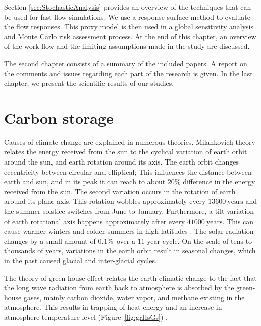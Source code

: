 Section \ref{sec:StochasticAnalysis} provides an overview of the techniques that can be used for fast flow simulations. We use a response surface
method to evaluate the flow responses. This proxy model is then used in a global sensitivity analysis and Monte Carlo risk assessment process. At the end of this chapter, an overview of the work-flow and the limiting assumptions made in the study are discussed.

The second chapter consists of a summary of the included papers. A report on the comments and issues regarding each part of the research is given. In the last chapter, we present the scientific results of our studies.  

\section{Carbon storage}
\label{sec:CarbonStorage}
Causes of climate change are explained in numerous theories. Milankovich theory \cite{foukal2006variations} relates the energy received from the sun to the  cyclical variation of earth orbit around the sun, and earth rotation around its axis. The earth orbit changes eccentricity between circular and elliptical; This influences the distance between earth and sun, and  in its peak it can reach to about $20\%$ difference in the energy received
from the sun. The second variation occurs in the rotation of earth around its
plane axis. This rotation wobbles approximately every $13600~\mbox{years}$ and
the summer solstice switches from June to January. Furthermore, a tilt variation of
earth rotational axis happens approximately after every $41000~\mbox{years}$.
This can cause warmer winters and colder summers in high latitudes
\cite{foukal2006variations}. The solar radiation changes by a small amount of $0.1\%$~over a $11$ year cycle. On the scale of tens to thousands of years, variations in the earth orbit
result in seasonal changes, which in the past caused glacial and inter-glacial
cycles.

The theory of green house effect relates the earth climatic change to the fact
that the long wave radiation from earth back to atmosphere is absorbed by the
green-house gases, mainly carbon dioxide, water vapor, and methane existing in
the atmosphere. This results in trapping of heat energy and an increase in
atmosphere temperature level (Figure~\ref{fig:grHsGs})
\cite{foukal2006variations}.

